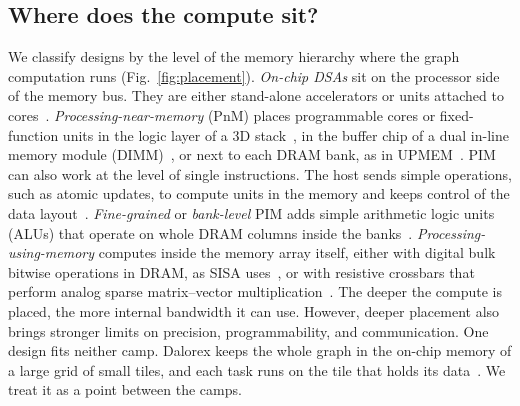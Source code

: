 \documentclass[journal,onecolumn]{IEEEtran}
\begin{document}
\subsection{Where does the compute sit?}
We classify designs by the level of the memory hierarchy where the graph computation runs (Fig.~\ref{fig:placement}). \emph{On-chip DSAs} sit on the processor side of the memory bus. They are either stand-alone accelerators or units attached to cores~\cite{ham2016graphicionado,mukkara2018hats,zhao2022tdgraph}. \emph{Processing-near-memory} (PnM) places programmable cores or fixed-function units in the logic layer of a 3D stack~\cite{ahn2015tesseract,zhuo2019graphq}, in the buffer chip of a dual in-line memory module (DIMM)~\cite{talati2022ndminer}, or next to each DRAM bank, as in UPMEM~\cite{gomezluna2022prim}. PIM can also work at the level of single instructions. The host sends simple operations, such as atomic updates, to compute units in the memory and keeps control of the data layout~\cite{ahn2015pei,nai2017graphpim}. \emph{Fine-grained} or \emph{bank-level} PIM adds simple arithmetic logic units (ALUs) that operate on whole DRAM columns inside the banks~\cite{yenimol2026cograf,shin2025fala}. \emph{Processing-using-memory} computes inside the memory array itself, either with digital bulk bitwise operations in DRAM, as SISA uses~\cite{besta2021sisa}, or with resistive crossbars that perform analog sparse matrix--vector multiplication~\cite{song2018graphr,zheng2020spara,challapalle2020gaasx}. The deeper the compute is placed, the more internal bandwidth it can use. However, deeper placement also brings stronger limits on precision, programmability, and communication. One design fits neither camp. Dalorex keeps the whole graph in the on-chip memory of a large grid of small tiles, and each task runs on the tile that holds its data~\cite{orenesvera2023dalorex}. We treat it as a point between the camps.
\end{document}
